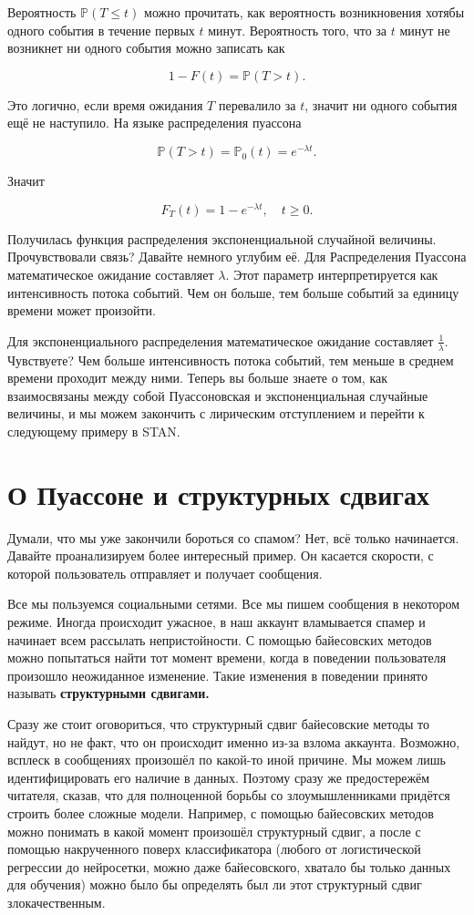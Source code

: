 \documentclass[12pt, a4paper, oneside]{extreport}
\def \mbb{\mathbb}
\def \PP{\mbb{P}}
\newcommand{\indef}[1]{\textbf{#1}}     %
\theoremstyle{plain}              %
\theoremstyle{definition}         %
\begin{document}
Вероятность $\PP(T \le t)$ можно прочитать, как вероятность возникновения хотябы одного события в течение первых $t$ минут. Вероятность того, что за $t$ минут не возникнет ни одного события можно записать как 

\[1 - F(t) = \PP(T > t).\]

Это логично, если время ожидания $T$ перевалило за $t$, значит ни одного события ещё не наступило. На языке распределения пуассона 

\[\PP(T > t) = \PP_0(t) = e^{-\lambda t}.\] 

Значит 

\[ F_T(t) = 1 - e^{-\lambda t}, \quad t \ge 0.\]

Получилась функция распределения экспоненциальной случайной величины. Прочувствовали связь?  Давайте немного углубим её. Для Распределения Пуассона математическое ожидание составляет $\lambda$. Этот параметр интерпретируется как интенсивность потока событий. Чем он больше, тем больше событий за единицу времени может произойти. 

Для экспоненциального распределения математическое ожидание составляет $\frac{1}{\lambda}$. Чувствуете? Чем больше интенсивность потока событий, тем меньше в среднем времени проходит между ними.  Теперь вы больше знаете о том, как взаимосвязаны между собой Пуассоновская и экспоненциальная случайные величины, и мы можем закончить с лирическим отступлением и перейти к следующему примеру в STAN. 

\section{О Пуассоне и структурных сдвигах} 

Думали, что мы уже закончили бороться со спамом? Нет, всё только начинается.  Давайте проанализируем более интересный пример. Он касается скорости, с которой пользователь отправляет и получает сообщения. 

Все мы пользуемся социальными сетями. Все мы пишем сообщения в некотором режиме. Иногда происходит ужасное, в наш аккаунт вламывается спамер и начинает всем рассылать непристойности. С помощью байесовских методов можно попытаться найти тот момент времени, когда в поведении пользователя произошло неожиданное изменение. Такие изменения в поведении принято называть \indef{структурными сдвигами.}

Сразу же стоит оговориться, что структурный сдвиг байесовские методы то найдут, но не факт, что он происходит именно из-за взлома аккаунта. Возможно, всплеск в сообщениях произошёл по какой-то иной причине.  Мы можем лишь идентифицировать его наличие в данных. Поэтому сразу же предостережём читателя, сказав, что для полноценной борьбы со злоумышленниками придётся строить более сложные модели. Например, с помощью байесовских методов можно понимать в какой момент произошёл структурный сдвиг, а после с помощью накрученного поверх классификатора (любого от логистической регрессии до нейросетки, можно даже байесовского, хватало бы только данных для обучения) можно было бы определять был ли этот структурный сдвиг злокачественным. 
\end{document}
